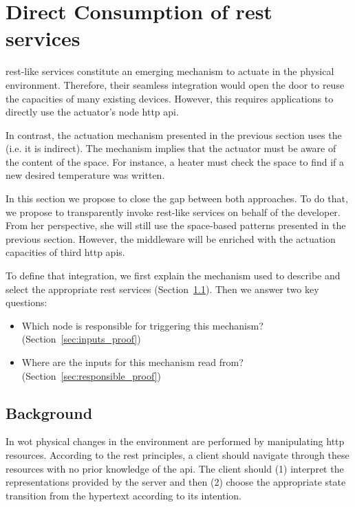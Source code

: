 
\section{Direct Consumption of \acs{rest} services}

\ac{rest}-like services constitute an emerging mechanism to actuate in the physical environment. %
Therefore, their seamless integration would open the door to reuse the capacities of many existing devices. %
However, this requires applications to directly use the actuator's node \ac{http} \ac{api}.


In contrast, the actuation mechanism presented in the previous section uses the \Space{} (i.e. it is indirect).
The mechanism implies that the actuator must be aware of the content of the space.
For instance, a heater must check the space to find if a new desired temperature was written.


In this section we propose to close the gap between both approaches. %
To do that, we propose to transparently invoke \ac{rest}-like services on behalf of the developer.
From her perspective, she will still use the space-based patterns presented in the previous section.
However, the middleware will be enriched with the actuation capacities of third \ac{http} \acp{api}.


To define that integration, we first explain the mechanism used to describe and select the appropriate \ac{rest} services (Section~\ref{sec:background_restdesc}).
Then we answer two key questions:
\begin{itemize}
  \item Which node is responsible for triggering this mechanism? (Section~\ref{sec:inputs_proof})
  \item Where are the inputs for this mechanism read from? (Section~\ref{sec:responsible_proof})
\end{itemize}



\subsection{Background}
\label{sec:background_restdesc}

In \ac{wot} physical changes in the environment are performed by manipulating \ac{http} resources.
According to the \ac{rest} principles, a client should navigate through these resources with no prior knowledge of the \ac{api}.
The client should (1) interpret the representations provided by the server and then (2) choose the appropriate state transition from the hypertext according to its intention. %


